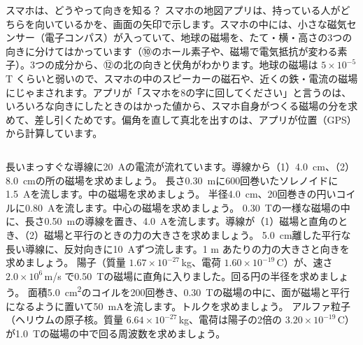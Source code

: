 \begin{column}{スマホは、どうやって向きを知る？}
スマホの地図アプリは、持っている人がどちらを向いているかを、画面の矢印で示します。スマホの中には、小さな磁気センサー（電子コンパス）が入っていて、地球の磁場を、たて・横・高さの3つの向きに分けてはかっています（⑩のホール素子や、磁場で電気抵抗が変わる素子）。3つの成分から、⑫の北の向きと伏角がわかります。地球の磁場は $5\times10^{-5}$\,T くらいと弱いので、スマホの中のスピーカーの磁石や、近くの鉄・電流の磁場にじゃまされます。アプリが「スマホを8の字に回してください」と言うのは、いろいろな向きにしたときのはかった値から、スマホ自身がつくる磁場の分を求めて、差し引くためです。偏角を直して真北を出すのは、アプリが位置（GPS）から計算しています。
\end{column}


\bkendproblems
{}
\bkproblem 長いまっすぐな導線に\qty{20}{A}の電流が流れています。導線から（1）\qty{4.0}{cm}、（2）\qty{8.0}{cm}の所の磁場を求めましょう。
\bkproblem 長さ\qty{0.30}{m}に600回巻いたソレノイドに\qty{1.5}{A}を流します。中の磁場を求めましょう。
\bkproblem 半径\qty{4.0}{cm}、20回巻きの円いコイルに\qty{0.80}{A}を流します。中心の磁場を求めましょう。
\bkproblem \qty{0.30}{T}の一様な磁場の中に、長さ\qty{0.50}{m}の導線を置き、\qty{4.0}{A}を流します。導線が（1）磁場と直角のとき、（2）磁場と平行のときの力の大きさを求めましょう。
\bkproblem \qty{5.0}{cm}離した平行な長い導線に、反対向きに\qty{10}{A}ずつ流します。1 m あたりの力の大きさと向きを求めましょう。
\bkproblem 陽子（質量 $1.67\times10^{-27}$\,kg、電荷 $1.60\times10^{-19}$\,C）が、速さ $2.0\times10^6$\,m/s で\qty{0.50}{T}の磁場に直角に入りました。回る円の半径を求めましょう。
\bkproblem 面積\qty{5.0}{cm^2}のコイルを200回巻き、\qty{0.30}{T}の磁場の中に、面が磁場と平行になるように置いて\qty{50}{mA}を流します。トルクを求めましょう。
\bkproblem アルファ粒子（ヘリウムの原子核。質量 $6.64\times10^{-27}$\,kg、電荷は陽子の2倍の $3.20\times10^{-19}$\,C）が\qty{1.0}{T}の磁場の中で回る周波数を求めましょう。
